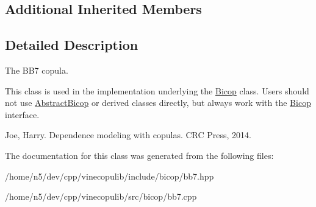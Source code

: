 \subsection*{Additional Inherited Members}


\subsection{Detailed Description}
The B\+B7 copula. 

This class is used in the implementation underlying the \hyperlink{classvinecopulib_1_1_bicop}{Bicop} class. Users should not use \hyperlink{classvinecopulib_1_1_abstract_bicop}{Abstract\+Bicop} or derived classes directly, but always work with the \hyperlink{classvinecopulib_1_1_bicop}{Bicop} interface.

Joe, Harry. Dependence modeling with copulas. C\+RC Press, 2014. 

The documentation for this class was generated from the following files\+:\begin{DoxyCompactItemize}
\item 
/home/n5/dev/cpp/vinecopulib/include/bicop/bb7.\+hpp\item 
/home/n5/dev/cpp/vinecopulib/src/bicop/bb7.\+cpp\end{DoxyCompactItemize}
